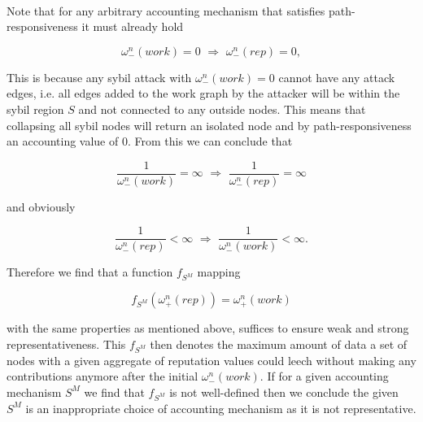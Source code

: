 \begin{remark}[]\ \\
\label{rem:Representativeness Function}
\noindent{}Note that for any arbitrary accounting mechanism that satisfies path-responsiveness it must already hold

\[
\omega_{-}^{n}(work)=0 \,\,\Longrightarrow \,\, \omega_{-}^{n}(rep)=0,
\]

\noindent{}This is because any sybil attack with $\omega_{-}^{n}(work)=0$ cannot have any attack edges, i.e. all edges added to the work graph by the attacker will be within the sybil region $S$ and not connected to any outside nodes. This means that collapsing all sybil nodes will return an isolated node and by path-responsiveness an accounting value of $0$. From this we can conclude that 

\[
\frac{1}{\omega_{-}^{n}(work)} = \infty \,\, \Longrightarrow \,\, \frac{1}{\omega_{-}^{n}(rep)} = \infty
\]

\noindent{}and obviously

\[
\frac{1}{\omega_{-}^{n}(rep)} < \infty \,\, \Longrightarrow \,\, \frac{1}{\omega_{-}^{n}(work)} < \infty.
\]

\noindent{}Therefore we find that a function $f_{S^M}$ mapping 

\[
f_{S^M}(\omega^n_{+}(rep)) = \omega^n_{+}(work)
\]

\noindent{}with the same properties as mentioned above, suffices to ensure weak and strong representativeness. This $f_{S^M}$ then denotes the maximum amount of data a set of nodes with a given aggregate of reputation values could leech without making any contributions anymore after the initial $\omega_{-}^{n}(work)$. If for a given accounting mechanism $S^M$ we find that $f_{S^M}$ is not well-defined then we conclude the given $S^M$ is an inappropriate choice of accounting mechanism as it is not representative.\vspace{1em}\\
\end{remark}

